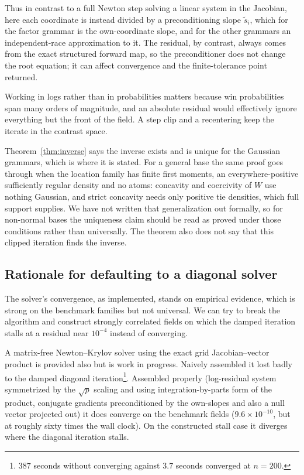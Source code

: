 \documentclass[11pt]{article}
\begin{document}
Thus in contrast to a full Newton step solving a linear system in the Jacobian, here each
coordinate is instead divided by a preconditioning slope $\tilde s_i$,
which for the factor grammar is the own-coordinate slope, and for the other grammars an independent-race
approximation to it. The residual, by contrast, always comes from the
exact structured forward map, so the preconditioner does not change the
root equation; it can affect convergence and the finite-tolerance point
returned.

Working in logs rather than in probabilities matters because win probabilities span
many orders of magnitude, and an absolute residual would effectively
ignore everything but the front of the field. A step clip and a
recentering keep the iterate in the contrast space.

Theorem~\ref{thm:inverse} says the inverse exists and is unique for the
Gaussian grammars, which is where it is stated. For a general base the
same proof goes through when the location family has finite first
moments, an everywhere-positive sufficiently regular density and no
atoms: concavity and coercivity of $W$ use nothing Gaussian, and strict
concavity needs only positive tie densities, which full support supplies.
We have not written that generalization out formally, so for non-normal
bases the uniqueness claim should be read as proved under those
conditions rather than universally. The theorem also does not say that
this clipped iteration finds the inverse.

\subsection{Rationale for defaulting to a diagonal solver}

The solver's convergence, as implemented, stands on empirical evidence, which is strong on the
benchmark families but not universal. We can try to break the algorithm and construct strongly
correlated fields on which the damped iteration stalls at a residual
near $10^{-4}$ instead of converging.

A matrix-free Newton--Krylov solver using the exact grid Jacobian--vector product is
provided also but is work in progress. Naively assembled it lost badly to the damped diagonal iteration\footnote{
$387$ seconds without converging against $3.7$ seconds converged at
$n=200$.}. Assembled properly (log-residual system symmetrized by the
$\sqrt{p}$ scaling and using integration-by-parts form of the product,
conjugate gradients preconditioned by the own-slopes and also a null vector
projected out) it
does converge on the benchmark fields ($9.6\times10^{-10}$, but at roughly
sixty times the wall clock). On the constructed stall case it
diverges where the diagonal iteration stalls.
\end{document}
